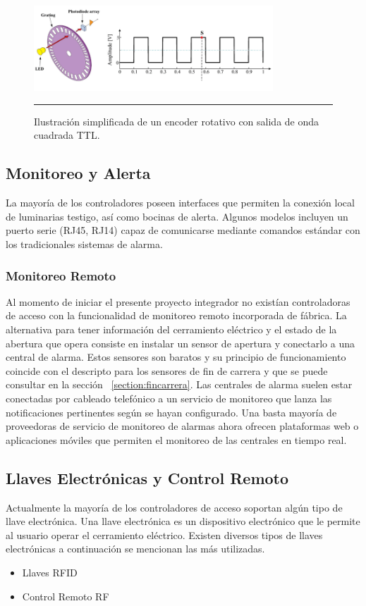 \begin{figure}[htbp]
	\centering
	\includegraphics[width=0.8\textwidth]{Pictures/encoder00.png}
	\rule{35em}{1pt}
	\caption[Encoder Rotativo]{Ilustración simplificada de un encoder rotativo con salida de onda cuadrada TTL. }
	\label{fig:encoder00}
\end{figure}


\subsection{Monitoreo y Alerta}
La mayoría de los controladores poseen interfaces que permiten la conexión local de luminarias testigo, así como bocinas de alerta. Algunos modelos incluyen un puerto serie (RJ45, RJ14) capaz de comunicarse mediante comandos estándar con los tradicionales sistemas de alarma.

\subsubsection{Monitoreo Remoto}
Al momento de iniciar el presente proyecto integrador no existían controladoras de acceso con la funcionalidad de monitoreo remoto incorporada de fábrica.
La alternativa para tener información del cerramiento eléctrico y el estado de la abertura que opera consiste en instalar un sensor de apertura y conectarlo a una central de alarma. Estos sensores son baratos y su principio de funcionamiento coincide con el descripto para los sensores de fin de carrera y que se puede consultar en la sección ~\ref{section:fincarrera}.
Las centrales de alarma suelen estar conectadas por cableado telefónico a un servicio de monitoreo que lanza las notificaciones pertinentes según se hayan configurado.
Una basta mayoría de proveedoras de servicio de monitoreo de alarmas ahora ofrecen plataformas web o aplicaciones móviles que permiten el monitoreo de las centrales en tiempo real.

\subsection{Llaves Electrónicas y Control Remoto}
Actualmente la mayoría de los controladores de acceso soportan algún tipo de llave electrónica.
Una llave electrónica es un dispositivo electrónico que le permite al usuario operar el cerramiento eléctrico. Existen diversos tipos de llaves electrónicas a continuación se mencionan las más utilizadas.
\begin{itemize}
	\item Llaves RFID
	\item Control Remoto RF
\end{itemize}

